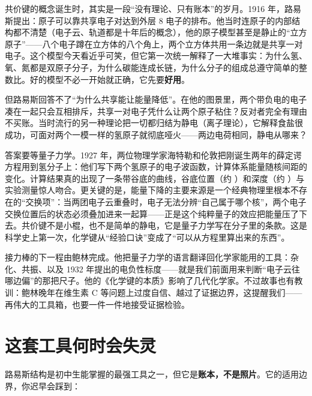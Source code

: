 \begin{zhengju}
共价键的概念诞生时，其实是一段“没有理论、只有账本”的岁月。1916 年，路易斯提出：原子可以靠共享电子对达到外层 8 电子的排布。他当时连原子的内部结构都不清楚（电子云、轨道都是十年后的概念），他的原子模型甚至是静止的“立方原子”——八个电子蹲在立方体的八个角上，两个立方体共用一条边就是共享一对电子。这个模型今天看近乎可笑，但它第一次统一解释了一大堆事实：为什么氢、氧、氮都是双原子分子，为什么碳能连成长链，为什么分子的组成总遵守简单的整数比。好的模型不必一开始就正确，它先要\textbf{好用}。

但路易斯回答不了“为什么共享能让能量降低”。在他的图景里，两个带负电的电子凑在一起只会互相排斥，共享一对电子凭什么让两个原子粘住？反对者完全有理由不买账。当时流行的另一种理论把一切都归结为静电（离子理论），它解释食盐很成功，可面对两个一模一样的氢原子就彻底哑火——两边电荷相同，静电从哪来？

答案要等量子力学。1927 年，两位物理学家海特勒和伦敦把刚诞生两年的薛定谔方程用到氢分子上：他们写下两个氢原子的电子波函数，计算体系能量随核间距的变化。计算结果真的出现了一条带谷底的曲线，谷底位置（约 ）和深度（约 ）与实验测量惊人吻合。更关键的是，能量下降的主要来源是一个经典物理里根本不存在的“交换项”：当两团电子云重叠时，电子无法分辨“自己属于哪个核”，两个电子交换位置后的状态必须叠加进来一起算——正是这个纯粹量子的效应把能量压了下去。共价键不是小棍，也不是简单的静电，它是量子力学写在分子里的条款。这是科学史上第一次，化学键从“经验口诀”变成了“可以从方程里算出来的东西”。

接力棒的下一程由鲍林完成。他把量子力学的语言翻译回化学家能用的工具：杂化、共振、以及 1932 年提出的电负性标度——就是我们前面用来判断“电子云往哪边偏”的那把尺子。他的《化学键的本质》影响了几代化学家。不过故事也有教训：鲍林晚年在维生素 C 等问题上过度自信、越过了证据边界，这提醒我们——再伟大的工具箱，也要一件一件地接受证据检验。
\end{zhengju}

\section{这套工具何时会失灵}

路易斯结构是初中生能掌握的最强工具之一，但它是\textbf{账本，不是照片}。它的适用边界，你迟早会踩到：

